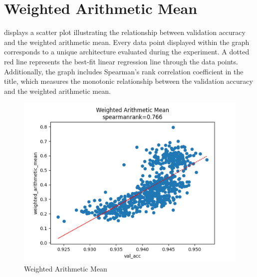 \section{Weighted Arithmetic Mean}

 displays a scatter plot illustrating the relationship between validation accuracy and the weighted arithmetic mean. Every data point displayed within the graph corresponds to a unique architecture evaluated during the experiment. A dotted red line represents the best-fit linear regression line through the data points. Additionally, the graph includes Spearman's rank correlation coefficient in the title, which measures the monotonic relationship between the validation accuracy and the weighted arithmetic mean. 

\begin{figure}[h!]
  \centering
  \includegraphics[width=0.9\columnwidth]{figures/weighted_average_upscaled.png}
  \caption{Weighted Arithmetic Mean}
  \label{fig:weighted}
\end{figure}